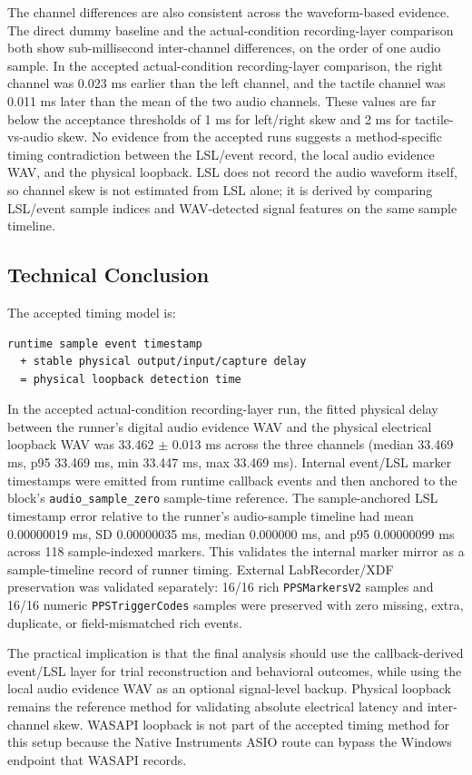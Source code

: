 \documentclass[11pt]{article}
\begin{document}
The channel differences are also consistent across the waveform-based evidence.
The direct dummy baseline and the actual-condition recording-layer comparison
both show sub-millisecond inter-channel differences, on the order of one audio
sample. In the accepted actual-condition recording-layer comparison, the right
channel was 0.023 ms earlier than the left channel, and the tactile channel was
0.011 ms later than the mean of the two audio channels. These values are far
below the acceptance thresholds of 1 ms for left/right skew and 2 ms for
tactile-vs-audio skew. No evidence from the accepted runs suggests a
method-specific timing contradiction between the LSL/event record, the local
audio evidence WAV, and the physical loopback. LSL does not record the audio
waveform itself, so channel skew is not estimated from LSL alone; it is derived
by comparing LSL/event sample indices and WAV-detected signal features on the
same sample timeline.

\subsection{Technical Conclusion}

The accepted timing model is:

\begin{verbatim}
runtime sample event timestamp
  + stable physical output/input/capture delay
  = physical loopback detection time
\end{verbatim}

In the accepted actual-condition recording-layer run, the fitted physical
delay between the runner's digital audio evidence WAV and the physical
electrical loopback WAV was 33.462 $\pm$ 0.013 ms across the three channels
(median 33.469 ms, p95 33.469 ms, min 33.447 ms, max 33.469 ms). Internal
event/LSL marker timestamps were emitted from runtime callback events and then
anchored to the block's \texttt{audio\_sample\_zero} sample-time reference. The
sample-anchored LSL timestamp error relative to the runner's audio-sample
timeline had mean 0.00000019 ms, SD 0.00000035 ms, median 0.000000 ms, and p95
0.00000099 ms across 118 sample-indexed markers. This validates the internal
marker mirror as a sample-timeline record of runner timing. External
LabRecorder/XDF preservation was validated separately: 16/16 rich
\texttt{PPSMarkersV2} samples and 16/16 numeric \texttt{PPSTriggerCodes}
samples were preserved with zero missing, extra, duplicate, or field-mismatched
rich events.

The practical implication is that the final analysis should use the
callback-derived event/LSL layer for trial reconstruction and behavioral
outcomes, while using the local audio evidence WAV as an optional signal-level
backup. Physical loopback remains the reference method for validating absolute
electrical latency and inter-channel skew. WASAPI loopback is not part of the
accepted timing method for this setup because the Native Instruments ASIO route
can bypass the Windows endpoint that WASAPI records.
\end{document}
